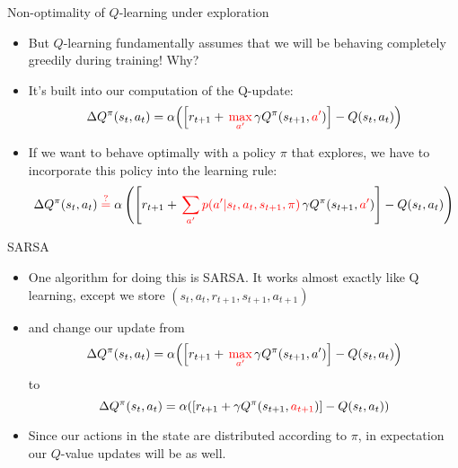 \documentclass{beamer} %
\begin{document}
\begin{frame}{Non-optimality of \(Q\)-learning under exploration}
\begin{itemize}
    \item But \(Q\)-learning fundamentally assumes that we will be behaving completely greedily during training! Why?
    \item<2-> It's built into our computation of the Q-update: 
        \[\Delta Q^{\pi}(s_{t}, a_t) = \alpha {\left( \left[ r_{t+1} + \, {\color{red} \max_{a'}} \, \gamma Q^{\pi}(s_{t+1}, {\color{red}a'}) \right] - Q(s_t, a_t)\right)}\]
    \item<3-> If we want to behave optimally with a policy \(\pi\) that explores, we have to incorporate this policy into the learning rule:
        {\footnotesize \[\Delta Q^{\pi}(s_{t}, a_t) \; {\color{red} \stackrel{?}{=}} \; \alpha \left( \left[ r_{t+1} + \, {\color{red} \sum_{a'} p(a' | s_t, a_t, s_{t+1}, \pi)} \, \gamma Q^{\pi}(s_{t+1}, {\color{red} a'}) \right] - Q(s_t, a_t)\right)\]}
\end{itemize}
\end{frame}


\begin{frame}{SARSA}
\begin{itemize}
    \item One algorithm for doing this is SARSA. It works almost exactly like Q learning, except we store \((s_t, a_t, r_{t+1}, s_{t+1}, a_{t+1})\)
    \item<2-> and change our update from 
        \[\Delta Q^{\pi}(s_{t}, a_t) = \alpha {\left( \left[ r_{t+1} + \, {\color{red} \max_{a'}} \, \gamma Q^{\pi}(s_{t+1}, a') \right] - Q(s_t, a_t)\right)}\]
        to
        \[\Delta Q^{\pi}(s_{t}, a_t) = \alpha {\left( \left[ r_{t+1} + \gamma Q^{\pi}(s_{t+1}, {\color{red} a_{t+1}}) \right] - Q(s_t, a_t)\right)}\]
    \item<3-> Since our actions in the state are distributed according to \(\pi\), in expectation our \(Q\)-value updates will be as well.
\end{itemize}
\end{frame}
\end{document}
